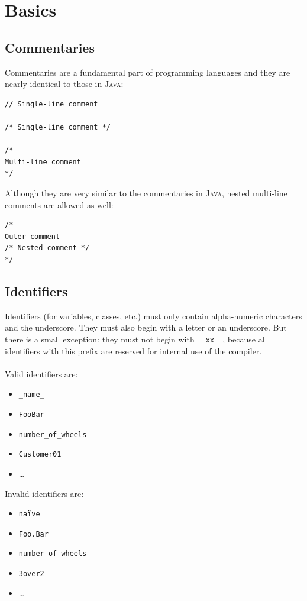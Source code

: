 \documentclass{report}
\def\java{\textsc{Java}\xspace}
\begin{document}
\section{Basics}

\subsection{Commentaries}

Commentaries are a fundamental part of programming languages and they are nearly identical to those
in \java:
\begin{lstlisting}
// Single-line comment

/* Single-line comment */

/*
Multi-line comment
*/
\end{lstlisting}
Although they are very similar to the commentaries in \java, nested multi-line comments are allowed as well:
\begin{lstlisting}
/*
Outer comment
/* Nested comment */
*/
\end{lstlisting}

\subsection{Identifiers}

Identifiers (for variables, classes, etc.) must only contain alpha-numeric characters and the underscore.
They must also begin with a letter or an underscore. But there is a small exception: they must not begin with
\texttt{\_\_xx\_\_}, because all identifiers with this prefix are reserved for internal use of the compiler. \\ \\
Valid identifiers are:
\begin{itemize}
	\item \texttt{\_name\_}
	\item \texttt{FooBar}
	\item \texttt{number\_of\_wheels}
	\item \texttt{Customer01}
	\item \dots
\end{itemize}
Invalid identifiers are:
\begin{itemize}
	\item \texttt{na\"{i}ve}
	\item \texttt{Foo.Bar}
	\item \texttt{number-of-wheels}
	\item \texttt{3over2}
	\item \dots
\end{itemize}
\end{document}
